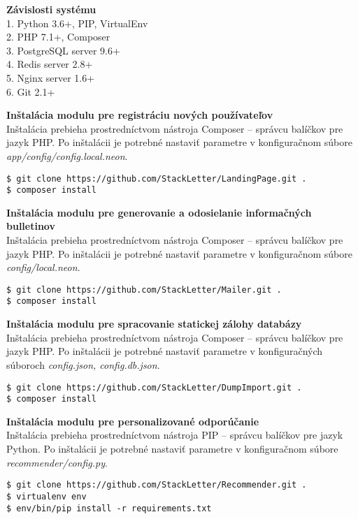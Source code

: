 \textbf{Závislosti systému}\\
1. Python 3.6+, PIP, VirtualEnv\\
2. PHP 7.1+, Composer\\
3. PostgreSQL server 9.6+\\
4. Redis server 2.8+\\
5. Nginx server 1.6+\\
6. Git 2.1+

\textbf{Inštalácia modulu pre registráciu nových používateľov}\\
Inštalácia prebieha prostredníctvom nástroja Composer -- správcu balíčkov pre jazyk PHP. Po inštalácii je potrebné nastaviť
parametre v konfiguračnom súbore \textit{app/config/config.local.neon}.

\lstset{language=nil}
\begin{lstlisting}
$ git clone https://github.com/StackLetter/LandingPage.git .
$ composer install
\end{lstlisting}

\textbf{Inštalácia modulu pre generovanie a odosielanie informačných bulletinov}\\
Inštalácia prebieha prostredníctvom nástroja Composer -- správcu balíčkov pre jazyk PHP. Po inštalácii je potrebné nastaviť
parametre v konfiguračnom súbore \textit{config/local.neon}.

\begin{lstlisting}
$ git clone https://github.com/StackLetter/Mailer.git .
$ composer install
\end{lstlisting}

\textbf{Inštalácia modulu pre spracovanie statickej zálohy databázy}\\
Inštalácia prebieha prostredníctvom nástroja Composer -- správcu balíčkov pre jazyk PHP. Po inštalácii je potrebné nastaviť
parametre v konfiguračných súboroch \textit{config.json, config.db.json}.

\begin{lstlisting}
$ git clone https://github.com/StackLetter/DumpImport.git .
$ composer install
\end{lstlisting}

\textbf{Inštalácia modulu pre personalizované odporúčanie}\\
Inštalácia prebieha prostredníctvom nástroja PIP -- správcu balíčkov pre jazyk Python. Po inštalácii je potrebné nastaviť
parametre v konfiguračnom súbore \textit{recommender/config.py}.

\begin{lstlisting}
$ git clone https://github.com/StackLetter/Recommender.git .
$ virtualenv env
$ env/bin/pip install -r requirements.txt
\end{lstlisting}


